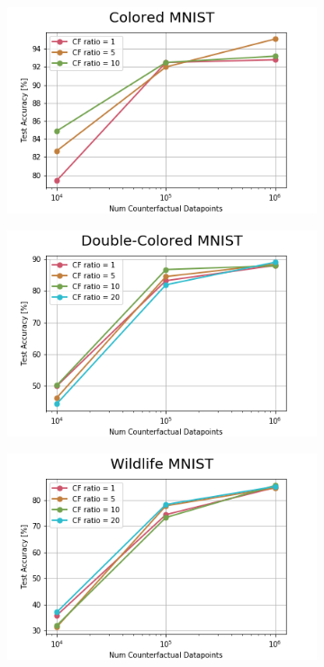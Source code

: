 \begin{figure}[h!]
     \centering
     \begin{subfigure}{0.3\linewidth}
         \centering
         \includegraphics[width=\textwidth]{../openreview/images/image-085.png}
     \end{subfigure}
     \begin{subfigure}{0.3\linewidth}
         \centering
         \includegraphics[width=\textwidth]{../openreview/images/image-087.png}
     \end{subfigure}
     \begin{subfigure}{0.3\linewidth}
         \centering
         \includegraphics[width=\textwidth]{../openreview/images/image-089.png}

\end{subfigure}
\end{figure}
